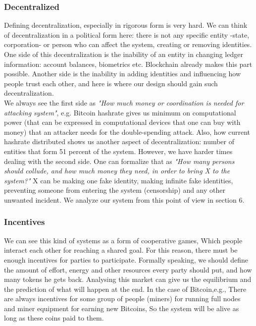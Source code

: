 \documentclass[conference]{IEEEtran}
\begin{document}
\subsubsection{Decentralized}

Defining decentralization, especially in rigorous form is very hard. We can think of decentralization in a political form here: there is not any specific entity -state, corporation- or person who can affect the system, creating or removing identities. One side of this decentralization is the inability of an entity in changing ledger information: account balances, biometrics etc. Blockchain already makes this part possible. Another side is the inability in adding identities and influencing how people trust each other, and here is where our design should gain such decentralization.
\\
We always see the first side as \textit{"How much money or coordination is needed for attacking system"}, e.g. Bitcoin hashrate gives us minimum on computational power (that can be expressed in computational devices that one can buy with money) that an attacker needs for the double-spending attack. Also, how current hashrate distributed shows us another aspect of decentralization: number of entities that form 51 percent of the system. However, we have harder times dealing with the second side. One can formalize that as \textit{"How many persons should collude, and how much money they need, in order to bring X to the system?"} X can be making one fake identity, making infinite fake identities, preventing someone from entering the system (censorship) and any other unwanted incident. We analyze our system from this point of view in section 6. 


\subsubsection{Incentives}
We can see this kind of systems as a form of cooperative games, Which people interact each other for reaching a shared goal. For this reason, there must be enough incentives for parties to participate. Formally speaking, we should define the amount of effort, energy and other resources every party should put, and how many tokens he gets back. Analysing this market can give us the equilibrium and the prediction of what will happen at the end. In the case of Bitcoin,e.g., There are always incentives for some group of people (miners) for running full nodes and miner equipment for earning new Bitcoins, So the system will be alive as long as these coins paid to them.
\end{document}
